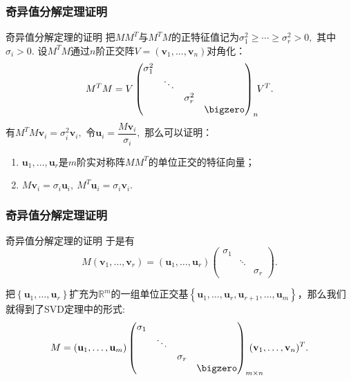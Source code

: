
\begin{frame}
\frametitle{奇异值分解定理证明}

\begin{block}{奇异值分解定理的证明}
把$MM^T$与$M^TM$的正特征值记为$\sigma_1^2 \geqslant \cdots \geqslant \sigma_r^2 > 0,$ 其中$\sigma_i>0.$ 设$M^TM$通过$n$阶正交阵$V = (\mathbf{v}_1,\ldots,\mathbf{v}_n)$对角化：
$$M^TM = V \begin{pmatrix}
\sigma_1^2 & & & \\ & \ddots & & \\ & & \sigma_r^2 & \\ & & & \bigzero \end{pmatrix}_n\!\! V^T.$$
有$M^TM\mathbf{v}_i = \sigma_i^2\mathbf{v}_i,$ 令$\mathbf{u}_i = \dfrac{M\mathbf{v}_i}{\sigma_i},$ 那么可以证明：

\pause

\begin{enumerate}
\item $\mathbf{u}_1, \ldots, \mathbf{u}_r$是$m$阶实对称阵$MM^T$的单位正交的特征向量；
\item $M\mathbf{v}_i = \sigma_i\mathbf{u}_i, \ M^T\mathbf{u}_i = \sigma_i\mathbf{v}_i.$
\end{enumerate}
\end{block}

\end{frame}


\begin{frame}
\frametitle{奇异值分解定理证明}

\begin{block}{奇异值分解定理的证明}
于是有
$$M(\mathbf{v}_1,\ldots,\mathbf{v}_r) = (\mathbf{u}_1,\ldots,\mathbf{u}_r) \begin{pmatrix}
\sigma_1 & & \\ & \ddots & \\ & & \sigma_r \end{pmatrix}.$$

\pause

把$\left\{ \mathbf{u}_1,\ldots,\mathbf{u}_r \right\}$扩充为$\mathbb{R}^m$的一组单位正交基$\left\{ \mathbf{u}_1,\ldots,\mathbf{u}_r,  \mathbf{u}_{r+1},\ldots,\mathbf{u}_m \right\}$，那么我们就得到了SVD定理中的形式:
$$M = (\mathbf{u}_1,\ldots,\mathbf{u}_m) \begin{pmatrix}
\sigma_1 & & & \\ & \ddots & & \\ & & \sigma_r & \\ & & & \bigzero \end{pmatrix}_{m\times n}\!\!\!\!\!\!\!\!\!\!(\mathbf{v}_1,\ldots,\mathbf{v}_n)^T.$$
\end{block}

\end{frame}

